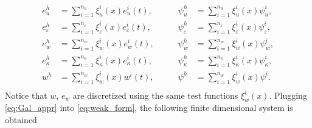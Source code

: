 \documentclass{ifacconf}
\begin{document}
\begin{equation}\label{eq:Gal_appr}
\begin{aligned}
	e_u^h &= \sum_{i=1}^{n_u} \xi_u^i(x) e_u^i(t), \\
	e_\varepsilon^h &= \sum_{i=1}^{n_\varepsilon} \xi_\varepsilon^i(x) e_\varepsilon^i(t), \\
	e_w^h &= \sum_{i=1}^{n_w} \xi_w^i(x) e_w^i(t), \\
	e_\kappa^h &= \sum_{i=1}^{n_\kappa} \xi_\kappa^i(x) e_\kappa^i(t), \\
	w^h &= \sum_{i=1}^{n_w} \xi_w^i(x) w^i(t), \\
\end{aligned} \qquad 
\begin{aligned}
	\psi_u^h &= \sum_{i=1}^{n_u} \xi_u^i(x) \psi_u^i, \\
	\psi_\varepsilon^h &= \sum_{i=1}^{n_\varepsilon} \xi_\varepsilon^i(x) \psi_\varepsilon^i, \\
	\psi_w^h &= \sum_{i=1}^{n_w} \xi_w^i(x) \psi_w^i, \\
    \psi_\kappa^h &= \sum_{i=1}^{n_\kappa} \xi_\kappa^i(x) \psi_\kappa^i, \\
	\psi^h &= \sum_{i=1}^{n_w} \xi_w^i(x) \psi^i. \\
\end{aligned}
\end{equation}
Notice that $w, \, e_w$ are discretized using the same test functions 
$\xi_w^i(x)$. Plugging \eqref{eq:Gal_appr} into \eqref{eq:weak_form}, the following finite dimensional system is obtained
\end{document}
